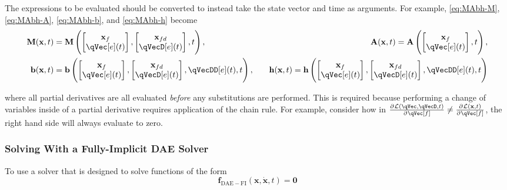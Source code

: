 \documentclass[11pt]{article}
\newcommand{\pD}[2]{
    \frac{\partial\mspace{1mu}#1}{\partial\mspace{1mu}#2}
}
\begin{document}
The expressions to be evaluated should be converted to instead take the state vector and time as arguments. For example, \eqref{eq:MAbh-M}, \eqref{eq:MAbh-A}, \eqref{eq:MAbh-b}, and \eqref{eq:MAbh-h} become
\begin{align}
    \mathbf{M}(\mathbf{x},t) &= \mathbf{M}\del{
        \begin{bmatrix}\mathbf{x}_{f}\\\qVec[e](t)\end{bmatrix},
        \begin{bmatrix}\mathbf{x}_{fd}\\\qVecD[e](t)\end{bmatrix},
        t
    },\quad
    &\mathbf{A}(\mathbf{x},t) = \mathbf{A}\del{
        \begin{bmatrix}\mathbf{x}_{f}\\\qVec[e](t)\end{bmatrix}
        , t
    },\nonumber\\
    \mathbf{b}(\mathbf{x},t) &= \mathbf{b}\del{
        \begin{bmatrix}\mathbf{x}_{f}\\\qVec[e](t)\end{bmatrix},
        \begin{bmatrix}\mathbf{x}_{fd}\\\qVecD[e](t)\end{bmatrix},
        \qVecDD[e](t),
        t
    },\quad
    &\mathbf{h}(\mathbf{x},t) = \mathbf{h}\del{
        \begin{bmatrix}\mathbf{x}_{f}\\\qVec[e](t)\end{bmatrix},
        \begin{bmatrix}\mathbf{x}_{fd}\\\qVecD[e](t)\end{bmatrix},
        \qVecDD[e](t),
        t
    }
\end{align}

where all partial derivatives are all evaluated \emph{before} any substitutions are performed. This is required because performing a change of variables inside of a partial derivative requires application of the chain rule. For example, consider how in $\pD{\mathcal{L}(\qVec, \qVecD, t)}{\qVec[f]}\neq\pD{\mathcal{L}(\mathbf{x},t)}{\qVec[f]}$, the right hand side will always evaluate to zero.


\subsubsection{Solving With a Fully-Implicit DAE Solver} \label{sssec:d:fwdDyn:DAE-fully-implicit}
To use a solver that is designed to solve functions of the form
\begin{equation}
    \mathbf{f}_{\mathrm{DAE-FI}}(\mathbf{x},\dot{\mathbf{x}},t) = \mathbf{0}
\end{equation}
\end{document}
